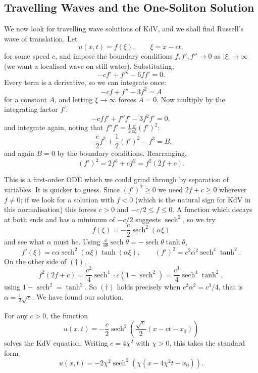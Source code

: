 \documentclass[a4paper]{scrartcl}
\DeclareMathOperator{\sech}{sech}
\begin{document}
\subsection{Travelling Waves and the One-Soliton Solution}

We now look for travelling wave solutions of KdV, and we shall find Russell's wave of translation. Let
$$
u(x,t) = f(\xi), \qquad \xi = x - ct,
$$
for some speed $c$, and impose the boundary conditions $f, f', f''\to 0$ as $|\xi|\to\infty$ (we want a localised wave on still water). Substituting,
$$
-cf' + f''' - 6ff' = 0.
$$
Every term is a derivative, so we can integrate once:
$$
-cf + f'' - 3f^2 = A
$$
for a constant $A$, and letting $\xi\to\infty$ forces $A = 0$. Now multiply by the integrating factor $f'$:
$$
-cff' + f''f' - 3f^2f' = 0,
$$
and integrate again, noting that $f''f' = \frac{1}{2}\frac{\dd}{\dd\xi}(f')^2$:
$$
-\frac{c}{2}f^2 + \frac{1}{2}(f')^2 - f^3 = B,
$$
and again $B = 0$ by the boundary conditions. Rearranging,
\begin{equation*}
(f')^2 = 2f^3 + cf^2 = f^2(2f + c). \tag{$\dagger$}
\end{equation*}

This is a first-order ODE which we could grind through by separation of variables. It is quicker to guess. Since $(f')^2 \ge 0$ we need $2f + c \ge 0$ wherever $f\neq 0$; if we look for a solution with $f < 0$ (which is the natural sign for KdV in this normalisation) this forces $c > 0$ and $-c/2 \le f \le 0$. A function which decays at both ends and has a minimum of $-c/2$ suggests $\sech^2$, so we try
$$
f(\xi) = -\frac{c}{2}\sech^2(\alpha\xi)
$$
and see what $\alpha$ must be. Using $\frac{\dd}{\dd\theta}\sech\theta = -\sech\theta\tanh\theta$,
$$
f'(\xi) = c\alpha\sech^2(\alpha\xi)\tanh(\alpha\xi), \qquad (f')^2 = c^2\alpha^2\sech^4\tanh^2.
$$
On the other side of $(\dagger)$,
$$
f^2(2f+c) = \frac{c^2}{4}\sech^4\cdot c\left(1 - \sech^2\right) = \frac{c^3}{4}\sech^4\tanh^2,
$$
using $1 - \sech^2 = \tanh^2$. So $(\dagger)$ holds precisely when $c^2\alpha^2 = c^3/4$, that is $\alpha = \frac{1}{2}\sqrt c$. We have found our solution.

\begin{proposition}
	For any $c>0$, the function
	$$
	u(x,t) = -\frac{c}{2}\sech^2\left(\frac{\sqrt c}{2}(x - ct - x_0)\right)
	$$
	solves the KdV equation. Writing $c = 4\chi^2$ with $\chi>0$, this takes the standard form
	$$
	u(x,t) = -2\chi^2\sech^2\left(\chi(x - 4\chi^2 t - x_0)\right).
	$$
\end{proposition}
\end{document}
